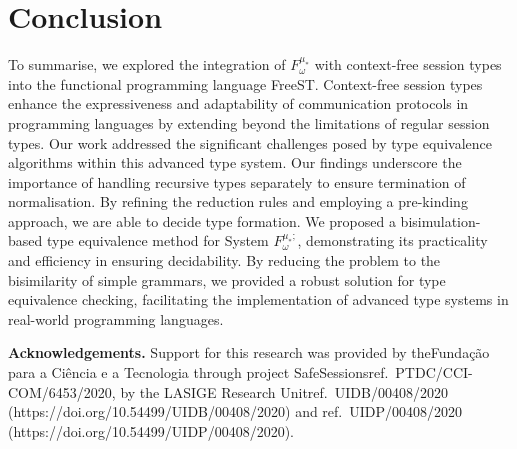 \section{Conclusion}\label{sec:conclusion}
 To summarise, we explored the integration of $F^{\mu_*}_\omega$ with context-free session types into the functional programming language FreeST. Context-free session types enhance the expressiveness and adaptability of communication protocols in programming languages by extending beyond the limitations of regular session types. Our work addressed the significant challenges posed by type equivalence algorithms within this advanced type system. Our findings underscore the importance of handling recursive types separately to ensure termination of normalisation. By refining the reduction rules and employing a pre-kinding approach, we are able to decide type formation.
We proposed a bisimulation-based type equivalence method for System $F^{\mu_*;}_\omega$, demonstrating its practicality and efficiency in ensuring decidability. By reducing the problem to the bisimilarity of simple grammars, we provided a robust solution for type equivalence checking, facilitating the implementation of advanced type systems in real-world programming languages.

\medskip

\noindent \textbf{Acknowledgements.} Support for this research was provided by the\linebreak Fundação para a Ciência e a Tecnologia through project SafeSessions\linebreak ref.\ PTDC/CCI-COM/6453/2020, by the LASIGE Research Unit\linebreak ref.\ UIDB/00408/2020 (https://doi.org/10.54499/UIDB/00408/2020) and ref.\ UIDP/00408/2020 (https://doi.org/10.54499/UIDP/00408/2020).
